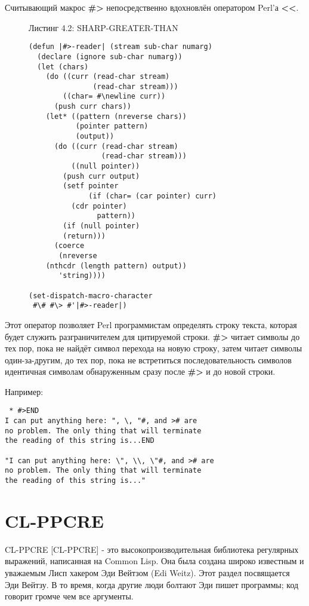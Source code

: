 Считывающий макрос \textbf{\#>} непосредственно вдохновлён оператором Perl'а \textbf{<<}. 

\begin{figure}Листинг 4.2: SHARP-GREATER-THAN\label{listing_4.2}
\listbegin
\begin{verbatim}
(defun |#>-reader| (stream sub-char numarg)
  (declare (ignore sub-char numarg))
  (let (chars)
    (do ((curr (read-char stream)
               (read-char stream)))
        ((char= #\newline curr))
      (push curr chars))
    (let* ((pattern (nreverse chars))
           (pointer pattern)
           (output))
      (do ((curr (read-char stream)
                 (read-char stream)))
          ((null pointer))
        (push curr output)
        (setf pointer
              (if (char= (car pointer) curr)
		  (cdr pointer)
                pattern))
        (if (null pointer)
	    (return)))
      (coerce
       (nreverse
	(nthcdr (length pattern) output))
       'string))))

(set-dispatch-macro-character
 #\# #\> #'|#>-reader|)
\end{verbatim}
\listend
\end{figure}

Этот оператор позволяет Perl программистам определять строку текста, которая будет служить разграничителем для цитируемой строки. \textbf{\#>} читает символы до тех пор, пока не найдёт символ перехода на новую строку, затем читает символы один-за-другим, до тех пор, пока не встретиться последовательность символов идентичная символам обнаруженным сразу после \textbf{\#>} и до новой строки.

Например:

\begin{verbatim}
 * #>END
I can put anything here: ", \, "#, and ># are
no problem. The only thing that will terminate
the reading of this string is...END

"I can put anything here: \", \\, \"#, and ># are
no problem. The only thing that will terminate
the reading of this string is..."
\end{verbatim}

\section{CL-PPCRE}\label{section_cl-ppcre}

CL-PPCRE [CL-PPCRE] - это высокопроизводительная библиотека регулярных выражений, написанная на Common Lisp. Она была создана широко известным и уважаемым Лисп хакером Эди Вейтзом (Edi Weitz). Этот раздел посвящается Эди Вейтзу. В то время, когда другие люди болтают Эди пишет программы; код говорит громче чем все аргументы.

